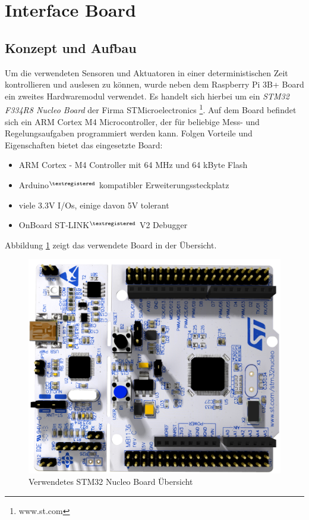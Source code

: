 \newpage
\section{Interface Board}
\label{sec:InterfaceBoard}
\subsection{Konzept und Aufbau}

Um die verwendeten Sensoren und Aktuatoren in einer deterministischen Zeit kontrollieren und auslesen zu können, wurde neben dem Raspberry Pi 3B+ Board ein zweites Hardwaremodul verwendet. Es handelt sich hierbei um ein \textit{STM32 F334R8 Nucleo Board} der Firma STMicroelectronics \footnote{www.st.com}. Auf dem Board befindet sich ein ARM Cortex M4 Microcontroller, der für beliebige Mess- und Regelungsaufgaben programmiert werden kann. Folgen Vorteile und Eigenschaften bietet das eingesetzte Board:
\begin{itemize}
\item ARM Cortex - M4 Controller mit 64 MHz und 64 kByte Flash
\item Arduino$^{\textregistered}$ kompatibler Erweiterungssteckplatz
\item viele 3.3V I/Os, einige davon 5V tolerant
\item OnBoard ST-LINK$^{\textregistered}$ V2 Debugger
\end{itemize}

Abbildung \ref{pic:STM32NucleoBoardPicture} zeigt das verwendete Board in der Übersicht.

\begin{figure}[hbtp]
\centering
\includegraphics[scale=0.4]{images/chapter5/STMNucleoBoardPicture.png}
\caption{Verwendetes STM32 Nucleo Board Übersicht}
\label{pic:STM32NucleoBoardPicture}
\end{figure}


